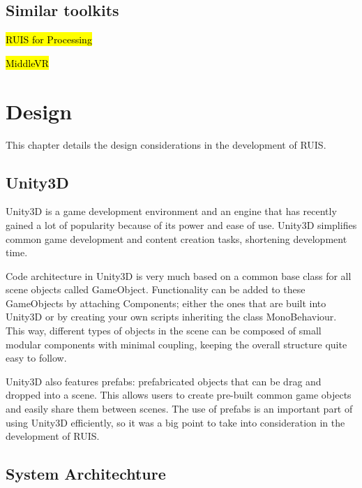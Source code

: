 \documentclass[12pt,a4paper,oneside,pdftex]{report}
\begin{document}
\section{Similar toolkits}
\label{section:similar}

\hl{RUIS for Processing}

\hl{MiddleVR}




\chapter{Design}
\label{chapter:design}

This chapter details the design considerations in the development of RUIS.

\section{Unity3D}
\label{section:unity3d}

Unity3D \cite{UnitySite} is a game development environment and an engine that has recently gained a lot of popularity because of its power and ease of use. Unity3D simplifies common game development and content creation tasks, shortening development time.

Code architecture in Unity3D is very much based on a common base class for all scene objects called GameObject. Functionality can be added to these GameObjects by attaching Components; either the ones that are built into Unity3D or by creating your own scripts inheriting the class MonoBehaviour. This way, different types of objects in the scene can be composed of small modular components with minimal coupling, keeping the overall structure quite easy to follow.

Unity3D also features prefabs: prefabricated objects that can be drag and dropped into a scene. This allows users to create pre-built common game objects and easily share them between scenes. The use of prefabs is an important part of using Unity3D efficiently, so it was a big point to take into consideration in the development of RUIS. 

\section{System Architechture}
\label{section:systemarchitecture}
\end{document}
